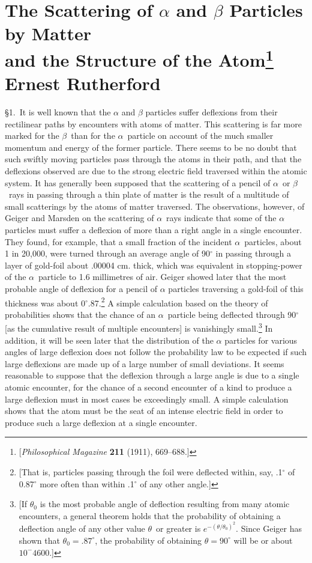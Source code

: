\section*{The Scattering of $\alpha$ and $\beta$ Particles by Matter\\
  and the Structure of the Atom\footnote{{[}\emph{Philosophical Magazine}
  \textbf{211} (1911), 669--688.{]}}\\
  {\large Ernest Rutherford}}



\S1.\ It is well known that the $\alpha$ and $\beta$ particles suffer
deflexions from their rectilinear paths by encounters with atoms of
matter. This scattering is far more marked for the $\beta$~than for the
$\alpha$~particle on account of the much smaller momentum and energy of
the former particle. There seems to be no doubt that such swiftly moving
particles pass through the atoms in their path, and that the deflexions
observed are due to the strong electric field traversed within the
atomic system. It has generally been supposed that the scattering of a
pencil of $\alpha$~or $\beta$~rays in passing through a thin plate of
matter is the result of a multitude of small scatterings by the atoms of
matter traversed. The observations, however, of Geiger and Marsden on
the scattering of $\alpha$~rays indicate that some of the $\alpha$
particles must suffer a deflexion of more than a right angle in a single
encounter. They found, for example, that a small fraction of the
incident $\alpha$~particles, about 1 in 20,000, were turned through an
average angle of 90$^\circ$ in passing through a layer of gold-foil about
.00004 cm. thick, which was equivalent in stopping-power of the
$\alpha$~particle to 1.6 millimetres of air. Geiger showed later that
the most probable angle of deflexion for a pencil of $\alpha$ particles
traversing a gold-foil of this thickness was about 0$^\circ$.87.\footnote{{[}That
  is, particles passing through the foil were deflected within, say, .1$^\circ$
  of 0.87$^\circ$ more often than within .1$^\circ$ of any other angle.{]}} A simple
calculation based on the theory of probabilities shows that the chance
of an $\alpha$~particle being deflected through 90$^\circ$ {[}as the cumulative
result of multiple encounters{]} is vanishingly small.\footnote{{[}If
  $\theta_0$ is the most probable angle of deflection resulting from many
  atomic encounters, a general theorem holds that the probability of
  obtaining a deflection angle of any other value $\theta$~or greater is
  $e^{-(\theta/\theta_0)^2}$. Since Geiger has shown that $\theta_0 = .87^{\circ}$, the probability of
  obtaining $\theta = 90^\circ$ will be or about $10^-{4600}$.{]}} In addition, it
will be seen later that the distribution of the $\alpha$ particles for
various angles of large deflexion does not follow the probability law to
be expected if such large deflexions are made up of a large number of
small deviations. It seems reasonable to suppose that the deflexion
through a large angle is due to a single atomic encounter, for the
chance of a second encounter of a kind to produce a large deflexion must
in most cases be exceedingly small. A simple calculation shows that the
atom must be the seat of an intense electric field in order to produce
such a large deflexion at a single encounter.

